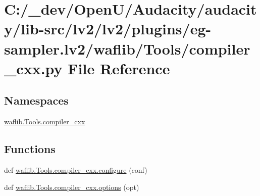 \hypertarget{lv2_2plugins_2eg-sampler_8lv2_2waflib_2_tools_2compiler__cxx_8py}{}\section{C\+:/\+\_\+dev/\+Open\+U/\+Audacity/audacity/lib-\/src/lv2/lv2/plugins/eg-\/sampler.lv2/waflib/\+Tools/compiler\+\_\+cxx.py File Reference}
\label{lv2_2plugins_2eg-sampler_8lv2_2waflib_2_tools_2compiler__cxx_8py}
\subsection*{Namespaces}
\begin{DoxyCompactItemize}
\item 
 \hyperlink{namespacewaflib_1_1_tools_1_1compiler__cxx}{waflib.\+Tools.\+compiler\+\_\+cxx}
\end{DoxyCompactItemize}
\subsection*{Functions}
\begin{DoxyCompactItemize}
\item 
def \hyperlink{namespacewaflib_1_1_tools_1_1compiler__cxx_a0788b7c415a9fd34ea0f3f575fe60db3}{waflib.\+Tools.\+compiler\+\_\+cxx.\+configure} (conf)
\item 
def \hyperlink{namespacewaflib_1_1_tools_1_1compiler__cxx_a26997eea0edf25e3990533d4011a38e5}{waflib.\+Tools.\+compiler\+\_\+cxx.\+options} (opt)
\end{DoxyCompactItemize}
